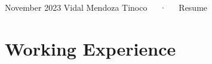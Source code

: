 \documentclass[11pt,a4paper,]{awesome-cv}
\begin{document}
\makecvheader

\makecvfooter
  {November 2023}
    { Vidal Mendoza Tinoco~~~·~~~Resume}
  {\thepage}





\hypertarget{working-experience}{%
\section{Working Experience}\label{working-experience}}
\end{document}
